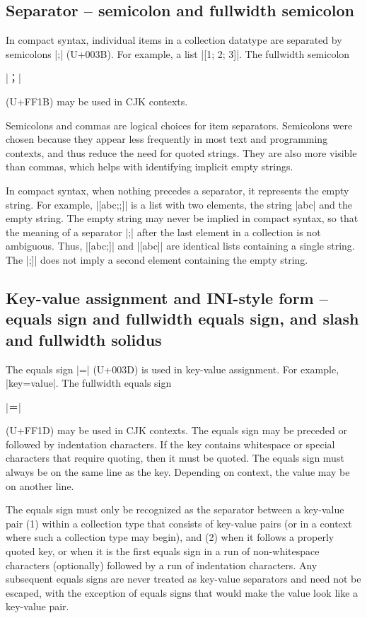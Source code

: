 \documentclass[11pt]{article}
\begin{document}
\subsection{Separator -- semicolon and fullwidth semicolon}

In compact syntax, individual items in a collection datatype are separated by semicolons |;| (U+003B).  For example, a list |[1; 2; 3]|.  The fullwidth semicolon \begin{CJK*}{UTF8}{gkai}|；|\end{CJK*} (U+FF1B) may be used in CJK contexts.

Semicolons and commas are logical choices for item separators.  Semicolons were chosen because they appear less frequently in most text and programming contexts, and thus reduce the need for quoted strings.  They are also more visible than commas, which helps with identifying implicit empty strings.

In compact syntax, when nothing precedes a separator, it represents the empty string.  For example, |[abc;;]| is a list with two elements, the string |abc| and the empty string.  The empty string may never be implied in compact syntax, so that the meaning of a separator |;| after the last element in a collection is not ambiguous.  Thus, |[abc;]| and |[abc]| are identical lists containing a single string.  The |;]| does not imply a second element containing the empty string.


\subsection{Key-value assignment and INI-style form -- equals sign and fullwidth equals sign, and slash and fullwidth solidus}

The equals sign |=| (U+003D) is used in key-value assignment.  For example, |key=value|.  The fullwidth equals sign \begin{CJK*}{UTF8}{gkai}|＝|\end{CJK*} (U+FF1D) may be used in CJK contexts.  The equals sign may be preceded or followed by indentation characters.  If the key contains whitespace or special characters that require quoting, then it must be quoted.  The equals sign must always be on the same line as the key.  Depending on context, the value may be on another line.

The equals sign must only be recognized as the separator between a key-value pair (1) within a collection type that consists of key-value pairs (or in a context where such a collection type may begin), and (2) when it follows a properly quoted key, or when it is the first equals sign in a run of non-whitespace characters (optionally) followed by a run of indentation characters.  Any subsequent equals signs are never treated as key-value separators and need not be escaped, with the exception of equals signs that would make the value look like a key-value pair.
\end{document}
